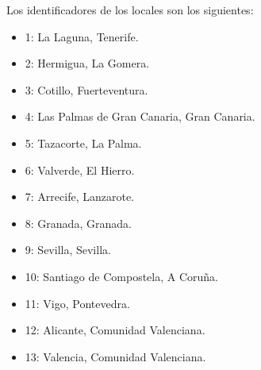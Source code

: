 \documentclass[12pt]{opticajnl}
\begin{document}
\noindent Los identificadores de los locales son los siguientes:
\begin{multicols}{2}
\begin{itemize}
\item 1: La Laguna, Tenerife.
\item 2: Hermigua, La Gomera.
\item 3: Cotillo, Fuerteventura.
\item 4: Las Palmas de Gran Canaria, Gran Canaria.
\item 5: Tazacorte, La Palma.
\item 6: Valverde, El Hierro.
\item 7: Arrecife, Lanzarote.
\item 8: Granada, Granada.
\item 9: Sevilla, Sevilla.
\item 10: Santiago de Compostela, A Coruña.
\item 11: Vigo, Pontevedra.
\item 12: Alicante, Comunidad Valenciana.
\item 13: Valencia, Comunidad Valenciana. 
\end{itemize}
\end{multicols}
\end{document}
